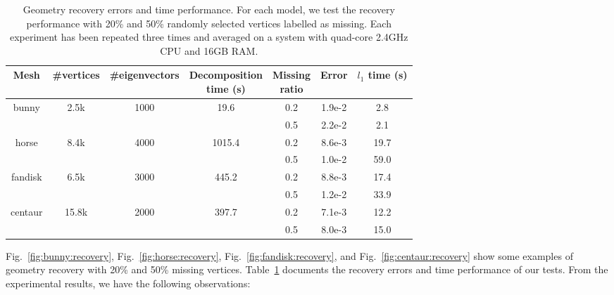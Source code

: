 \begin{table}
\centering
  \begin{tabular}{|c|c|c|c|c|c|c|}
  \hline
  Mesh                     & \#vertices                 & \#eigenvectors          & \pbox{20cm}{Decomposition\\ time (s)}        & \pbox{15cm}{Missing\\ ratio} & Error  & $l_1$ time (s) \\
  \hline
  \multirow{2}{3em}{bunny} & \multirow{2}{4em}{2.5k}    & \multirow{2}{5em}{1000} & \multirow{2}{5em}{19.6}   & 0.2          & 1.9e-2 & 2.8       \\
                           &                            &                         &                           & 0.5           & 2.2e-2 & 2.1       \\

  \hline
  \multirow{2}{3em}{horse} & \multirow{2}{4em}{8.4k}    & \multirow{2}{5em}{4000} & \multirow{2}{5em}{1015.4} & 0.2          & 8.6e-3 & 19.7      \\
                           &                            &                         &                           & 0.5           & 1.0e-2 & 59.0      \\
  \hline
  \multirow{2}{3em}{fandisk} & \multirow{2}{4em}{6.5k} & \multirow{2}{5em}{3000} & \multirow{2}{5em}{445.2}   & 0.2          & 8.8e-3 & 17.4      \\
                             &                          &                         &                           & 0.5           & 1.2e-2 & 33.9      \\
  \hline
  \multirow{2}{3em}{centaur} & \multirow{2}{4em}{15.8k} & \multirow{2}{5em}{2000} & \multirow{2}{5em}{397.7}  & 0.2          & 7.1e-3 & 12.2      \\
                             &                          &                         &                           & 0.5           & 8.0e-3 & 15.0      \\
  \hline
  \end{tabular}
\caption[Geometry recovery errors and time performance.]
{Geometry recovery errors and time performance. For each model, we test the recovery performance with
20\% and 50\% randomly selected vertices labelled as missing. Each experiment has been repeated three times
and averaged on a system with quad-core 2.4GHz CPU and 16GB RAM. }
\label{tab:recovery}
\end{table}

Fig.~\ref{fig:bunny:recovery}, Fig.~\ref{fig:horse:recovery}, Fig.~\ref{fig:fandisk:recovery}, and Fig.~\ref{fig:centaur:recovery}
show some examples of geometry recovery with 20\% and 50\%  missing vertices. Table~\ref{tab:recovery} documents
the recovery errors and time performance of our tests. From the experimental results, we have the following
observations:

